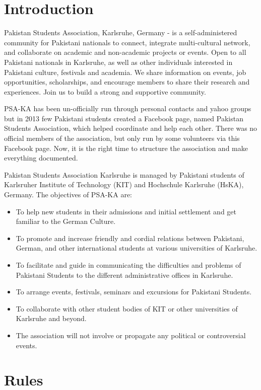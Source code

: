 \chapter{Introduction}
Pakistan Students Association, Karlsruhe, Germany - is a self-administered community for Pakistani nationals to connect, integrate multi-cultural network, and collaborate on academic and non-academic projects or events. Open to all Pakistani nationals in Karlsruhe, as well as other individuals interested in Pakistani culture, festivals and academia. We share information on events, job opportunities, scholarships, and encourage members to share their research and experiences. Join us to build a strong and supportive community.

PSA-KA has been un-officially run through personal contacts and yahoo groups but in 2013 few Pakistani students created a Facebook page, named Pakistan Students Association, which helped coordinate and help each other. There was no official members of the association, but only run by some volunteers via this Facebook page. Now, it is the right time to structure the association and make everything documented.

Pakistan Students  Association Karlsruhe is managed by Pakistani students of Karlsruher Institute of Technology (KIT) and Hochschule Karlsruhe (HsKA), Germany. 
The objectives of PSA-KA are:
\begin{itemize}
	\item To help new students in their admissions and initial settlement and get familiar to the German Culture.
	\item To promote and increase friendly and cordial relations between Pakistani, German, and other international students at various universities of Karlsruhe.
	\item To facilitate and guide in communicating the difficulties and problems of Pakistani Students to the different administrative offices in Karlsruhe.
	\item To arrange events, festivals, seminars and excursions for Pakistani Students.
	\item To collaborate with other student bodies of KIT or other universities of Karlsruhe and beyond.
	\item The association will not involve or propagate  any political or controversial events.
\end{itemize}

\chapter{Rules}
